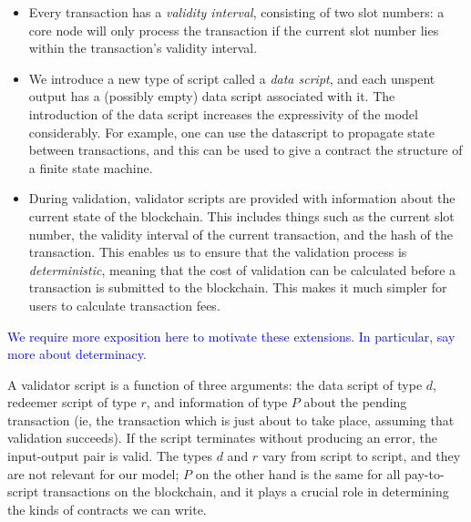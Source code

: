 \documentclass[a4paper]{article}
\newcommand{\blue}[1]{\textcolor{blue}{#1}}
\renewcommand{\i}{\textit}  %
\theoremstyle{definition}  %
\begin{document}
\begin{itemize}
\item Every transaction has a \textit{validity interval}, consisting
  of two slot numbers: a core node will only process the transaction
  if the current slot number lies within the transaction's validity
  interval.

\item We introduce a new type of script called a \i{data script}, and
  each unspent output has a (possibly empty) data script associated
  with it.  The introduction of the data script increases the
  expressivity of the model considerably. For example, one can use the
  datascript to propagate state between transactions, and this can be
  used to give a contract the structure of a finite state machine.

\item During validation, validator scripts are provided with
  information about the current state of the blockchain.  This
  includes things such as the current slot number, the validity
  interval of the current transaction, and the hash of the
  transaction.  This enables us to ensure that the validation process
  is \i{deterministic}, meaning that the cost of validation can be
  calculated before a transaction is submitted to the blockchain.
  This makes it much simpler for users to calculate transaction fees.
\end{itemize}
  

\noindent\blue{We require more exposition here to motivate these
  extensions.  In particular, say more about determinacy.}

A validator script is a function of three arguments: the data script
of type $d$, redeemer script of type $r$, and information of type $P$
about the pending transaction (ie, the transaction which is
  just about to take place, assuming that validation succeeds).  If
the script terminates without producing an error, the input-output
pair is valid. The types $d$ and $r$ vary from script to script, and
they are not relevant for our model; $P$ on the other hand is the same
for all pay-to-script transactions on the blockchain, and it plays a
crucial role in determining the kinds of contracts we can write.
\end{document}
